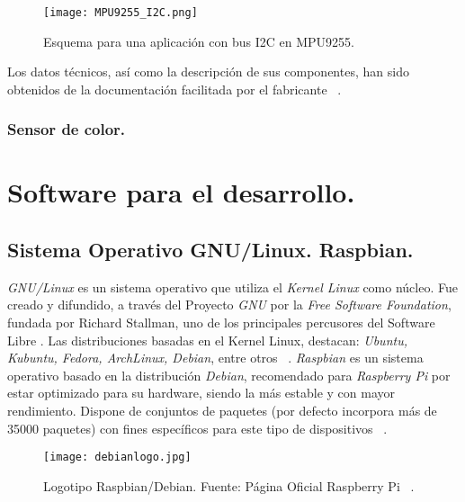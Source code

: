 \begin{figure}[!h]
\begin{center}
\texttt{[image: MPU9255\_I2C.png]}
\caption{Esquema para una aplicación con bus I2C en MPU9255.}
\label{fig:MPU9255_I2C}
\end{center}
\end{figure}

Los datos técnicos, así como la descripción de sus componentes, han sido obtenidos de la documentación facilitada por el fabricante ~\cite{MPU9255}.


\subsubsection{Sensor de color.}





\section{Software para el desarrollo.}
\label{sec:software}

\subsection{Sistema Operativo GNU/Linux. Raspbian.}
\label{subs:raspbian}
\emph{GNU/Linux} es un sistema operativo que utiliza el \emph{Kernel Linux} como núcleo. Fue creado y difundido, a través del Proyecto \emph{GNU} por la \emph{Free Software Foundation}, fundada por Richard Stallman, uno de los principales percusores del Software Libre .
Las distribuciones basadas en el Kernel Linux, destacan: \emph{Ubuntu, Kubuntu, Fedora, ArchLinux, Debian}, entre otros ~\cite{Upton}. 
\emph{Raspbian} es un sistema operativo basado en la distribución \emph{Debian}, recomendado para \emph{Raspberry Pi} por estar optimizado para su hardware, siendo la más estable y con mayor rendimiento. Dispone de conjuntos de paquetes (por defecto incorpora más de 35000 paquetes) con fines específicos para este tipo de dispositivos ~\cite{Upton}.

\begin{figure}[!h]
\begin{center}
\texttt{[image: debianlogo.jpg]}
\caption{Logotipo Raspbian/Debian. Fuente: Página Oficial Raspberry Pi ~\cite{Raspberry}.}
\label{fig:MPU9255_PINOUT}
\end{center}
\end{figure}

